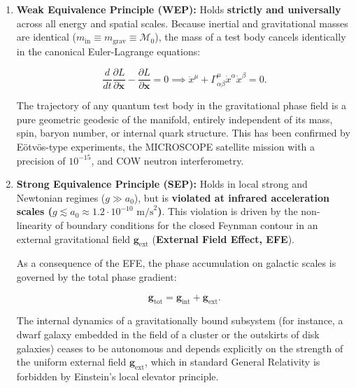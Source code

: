 \begin{enumerate}
\item \textbf{Weak Equivalence Principle (WEP):}
Holds \textbf{strictly and universally} across all energy and spatial scales. Because inertial and gravitational masses are identical ($m_{\text{in}} \equiv m_{\text{grav}} \equiv \mathcal{M}_0$), the mass of a test body cancels identically in the canonical Euler-Lagrange equations:

\begin{equation}\label{eq:2.55a}\label{eq:2.105}\tag{2.55a}
\frac{d}{dt}\frac{\partial L}{\partial \dot{\mathbf{x}}} - \frac{\partial L}{\partial \mathbf{x}} = 0 \implies \ddot{x}^\mu + \Gamma^\mu_{\alpha\beta} \dot{x}^\alpha \dot{x}^\beta = 0.
\end{equation}

The trajectory of any quantum test body in the gravitational phase field is a pure geometric geodesic of the manifold, entirely independent of its mass, spin, baryon number, or internal quark structure. This has been confirmed by E\"otv\"os-type experiments, the MICROSCOPE satellite mission with a precision of $10^{-15}$, and COW neutron interferometry.

\item \textbf{Strong Equivalence Principle (SEP):}
Holds in local strong and Newtonian regimes ($g \gg a_0$), but is \textbf{violated at infrared acceleration scales ($g \lesssim a_0 \approx 1.2 \cdot 10^{-10}\text{ m/s}^2$)}. 
This violation is driven by the non-linearity of boundary conditions for the closed Feynman contour in an external gravitational field $\mathbf{g}_{\text{ext}}$ (\textbf{External Field Effect, EFE}). 

As a consequence of the EFE, the phase accumulation on galactic scales is governed by the total phase gradient:

\begin{equation}\label{eq:2.55b}\label{eq:2.106}\tag{2.55b}
\mathbf{g}_{\text{tot}} = \mathbf{g}_{\text{int}} + \mathbf{g}_{\text{ext}}.
\end{equation}

The internal dynamics of a gravitationally bound subsystem (for instance, a dwarf galaxy embedded in the field of a cluster or the outskirts of disk galaxies) ceases to be autonomous and depends explicitly on the strength of the uniform external field $\mathbf{g}_{\text{ext}}$, which in standard General Relativity is forbidden by Einstein's local elevator principle.
\end{enumerate}

